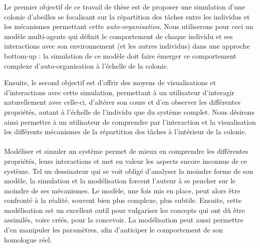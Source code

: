 	Le premier objectif de ce travail de thèse est de proposer une simulation d'une colonie d'abeilles se focalisant sur la répartition des tâches entre les individus et les mécanismes permettant cette \textit{auto-organisation}. Nous utiliserons pour ceci un modèle multi-agents qui définit le comportement de chaque individu et ses interactions avec son environnement (et les autres individus) dans une approche bottom-up : la simulation de ce modèle doit faire émerger ce comportement complexe d'auto-organisation à l'échelle de la colonie.
	
	Ensuite, le second objectif est d'offrir des moyens de visualisations et d'interactions avec cette simulation, permettant à un utilisateur d'interagir naturellement avec celle-ci, d'altérer son cours et d'en observer les différentes propriétés, autant à l'échelle de l'individu que du système complet. Nous désirons ainsi permettre à un utilisateur de comprendre par l'interaction et la visualisation les différents mécanismes de la répartition des tâches à l'intérieur de la colonie.
	
	\paragraph{}		
		Modéliser et simuler un système permet de mieux en comprendre les différentes propriétés, leurs interactions et met en valeur les aspects encore inconnus de ce système. Tel un dessinateur qui se voit obligé d'analyser la moindre forme de son modèle, la simulation et la modélisation forcent l'auteur à se pencher sur le moindre de ses mécanismes. Le modèle, une fois mis en place, peut alors être confronté à la réalité, souvent bien plus complexe, plus subtile. Ensuite, cette modélisation est un excellent outil pour vulgariser les concepts qui ont dû être assimilés, voire créés, pour la concevoir. La modélisation peut aussi permettre d'en manipuler les paramètres, afin d'anticiper le comportement de son homologue réel.
		
	
